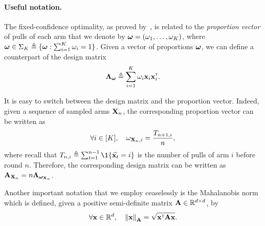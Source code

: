 \paragraph{Useful notation.}
The fixed-confidence optimality, as proved by~\cite{garivier2016tracknstop,russo2016ttts}, is related to the \emph{proportion vector} of pulls of each arm that we denote by ${\boldsymbol \omega} = (\omega_1,\ldots,\omega_K)$, where ${\boldsymbol \omega}\in\Sigma_K \triangleq \{{\boldsymbol \omega} : \sum_{i=1}^K \omega_i = 1\}$. Given a vector of proportions ${\boldsymbol \omega}$, we can define a counterpart of the design matrix 
\[
    {\boldsymbol \Lambda}_{{\boldsymbol \omega}} \triangleq \sum_{i=1}^K \omega_i{\bf x}_i{\bf x}_i^\mathsf{\scriptscriptstyle T}.
\]

It is easy to switch between the design matrix and the proportion vector. Indeed, given a sequence of sampled arms ${\bf X}_n$, the corresponding proportion vector can be written as
\[
    \forall i\in [K], \quad \omega_{{\bf X}_n,i} = \frac{T_{n+1,i}}{n},
\]
where recall that $T_{n,i} \eqdef \sum_{t=1}^{n-1} \1\{\hat{\bx_t} = i\}$ is the number of pulls of arm $i$ before round $n$. Therefore, the corresponding design matrix can be written as ${\bf A}_{{\bf X}_n}=n{\boldsymbol \Lambda}_{{\boldsymbol \omega}_{{\bf X}_n}}$.

Another important notation that we employ ceaselessly is the Mahalanobis norm which is defined, given a positive semi-definite matrix ${\bf A}\in\mathbb{R}^{d\times d}$, by
\[
    \forall {\bf x}\in\mathbb{R}^d, \quad \left\lVert{\bf x}\right\rVert_{{\bf A}} = \sqrt{{\bf x}^\mathsf{\scriptscriptstyle T}{\bf A}{\bf x}}.
\]
